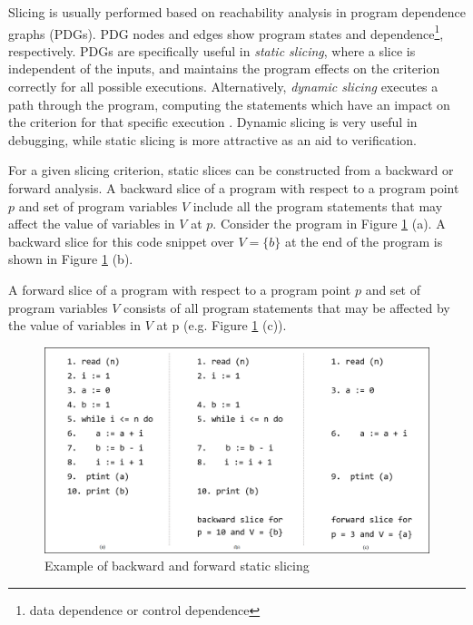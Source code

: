 Slicing is usually performed based on reachability analysis in program
dependence graphs (PDGs). PDG nodes and edges show program states and dependence\footnote{data dependence or control dependence}, respectively. PDGs are specifically useful in \emph{static slicing}, where
a slice is independent of the inputs,
 and maintains the program effects on the criterion
correctly for all possible executions. Alternatively,
\emph{dynamic slicing} executes a path through the program, computing the statements which have an impact on the criterion for that
specific execution \cite{Androutsopoulos}. Dynamic slicing is very useful in debugging, while static slicing is more attractive as an aid to verification.

For a given slicing criterion, static slices can be constructed from a backward or forward analysis.
A backward slice of a program with respect to a
program point $p$ and  set of program variables $V$ include all the program statements that may affect the value of variables in
$V$ at $p$. Consider the program in Figure \ref{fig:exslic} (a).
A backward slice for this code snippet over $V = \{b\}$ at the end of the program is shown in  Figure \ref{fig:exslic} (b).

A forward slice of a program with respect to a
program point $p$ and set of program variables $V$
consists of all program statements that may be affected by the value of
variables in $V$ at p (e.g.  Figure \ref{fig:exslic} (c)).


\begin{figure}
  \centering
  \includegraphics[width=\textwidth]{figs/exslic.png}
  \caption{Example of backward and forward static slicing}
 \label{fig:exslic}
\end{figure}

